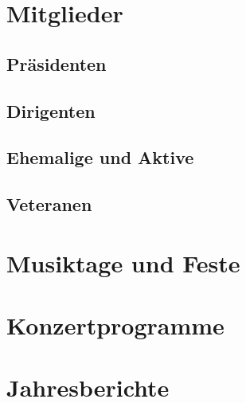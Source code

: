 \documentclass[]{book}
\begin{document}
\part{Mitglieder}

\chapter{Präsidenten}


\chapter{Dirigenten}


\chapter{Ehemalige und Aktive}


\chapter{Veteranen}




\part{Musiktage und Feste}







\part{Konzertprogramme}





\part{Jahresberichte}


\end{document}
